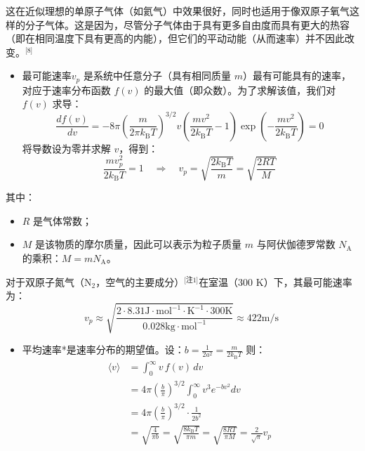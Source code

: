 这在近似理想的单原子气体（如氦气）中效果很好，同时也适用于像双原子氧气这样的分子气体。这是因为，尽管分子气体由于具有更多自由度而具有更大的热容（即在相同温度下具有更高的内能），但它们的平动动能（从而速率）并不因此改变。\(^\text{[8]}\)
\begin{itemize}
\item 最可能速率$v_p$ 是系统中任意分子（具有相同质量 $m$）最有可能具有的速率，对应于速率分布函数 $f(v)$ 的最大值（即众数）。为了求解该值，我们对 $f(v)$ 求导：
$$
\frac{df(v)}{dv} = -8\pi \left( \frac{m}{2\pi k_{\text{B}}T} \right)^{3/2} v \left( \frac{mv^2}{2k_{\text{B}}T} - 1 \right) \exp\left( -\frac{mv^2}{2k_{\text{B}}T} \right) = 0~
$$
将导数设为零并求解 $v$，得到：
$$
\frac{m v_p^2}{2k_{\text{B}} T} = 1 \quad \Rightarrow \quad v_p = \sqrt{\frac{2k_{\text{B}} T}{m}} = \sqrt{\frac{2RT}{M}}~
$$
\end{itemize}
其中：
\begin{itemize}
\item $R$ 是气体常数；
\item $M$ 是该物质的摩尔质量，因此可以表示为粒子质量 $m$ 与阿伏伽德罗常数 $N_{\mathrm{A}}$ 的乘积：$M = m N_{\mathrm{A}}$。
\end{itemize}
对于双原子氮气（$\mathrm{N}_2$，空气的主要成分）\(^\text{[注1]}\)在室温（300 K）下，其最可能速率为：
$$
v_p \approx \sqrt{ \frac{2 \cdot 8.31 \mathrm{J \cdot mol^{-1} \cdot K^{-1}} \cdot 300 \mathrm{K}}{0.028 \mathrm{kg \cdot mol^{-1}}} } \approx 422 \mathrm{m/s}~
$$
\begin{itemize}
\item 平均速率*是速率分布的期望值。设：$b = \frac{1}{2a^2} = \frac{m}{2k_{\text{B}} T}$
则：
$$
\begin{aligned}
\langle v \rangle &= \int_0^\infty v\, f(v)\, dv \\
&= 4\pi \left( \frac{b}{\pi} \right)^{3/2} \int_0^\infty v^3 e^{-b v^2} dv \\
&= 4\pi \left( \frac{b}{\pi} \right)^{3/2} \cdot \frac{1}{2b^2} \\
&= \sqrt{ \frac{4}{\pi b} } = \sqrt{ \frac{8k_{\text{B}} T}{\pi m} } = \sqrt{ \frac{8RT}{\pi M} } = \frac{2}{\sqrt{\pi}} v_p
\end{aligned}~
$$
\end{itemize}
